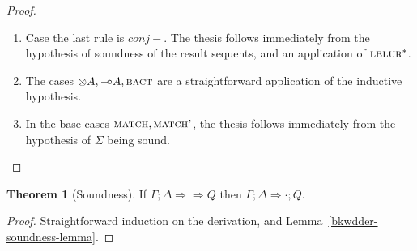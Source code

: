\documentclass{article}
\theoremstyle{definition}
\newtheorem{theorem}{Theorem}
\def\limp {\mathbin{{-}\mkern-3.5mu{\circ}}}
\newcommand{\bkwseq}[3]{#1 ; #2 \Longrightarrow #3}
\newcommand{\bneuseqsymb}{
  \mathrel{\Longrightarrow\!\!\!\!\!\!\!\!\Longrightarrow}}
\newcommand{\bneuseq}[3]{#1 ; #2 \bneuseqsymb #3}
\newcommand{\bact}{\textsc{bact}}
\newcommand{\matchrule}{\textsc{match}}
\newcommand{\matchprimerule}{\textsc{match'}}
\newcommand{\lblurstar}{\textsc{lblur}^*}
\begin{document}
\begin{proof}
\begin{enumerate}
  \item Case the last rule is $conj-$. The thesis follows immediately from
    the hypothesis of soundness of the result sequents, and an application of
    $\lblurstar$.
    
  \item The cases $\otimes A, \limp A, \bact$ are a straightforward application
    of the inductive hypothesis.
    
  \item In the base cases $\matchrule, \matchprimerule$, the thesis follows
    immediately from the hypothesis of $\Sigma$ being sound.

  \end{enumerate}
\end{proof}

\begin{theorem}[Soundness]
  If $\bneuseq{\Gamma}{\Delta}{Q}$ then $\bkwseq{\Gamma}{\Delta}{\cdot ; Q}$.  
\end{theorem}
\begin{proof}
  Straightforward induction on the derivation, and
  Lemma~\ref{bkwdder-soundness-lemma}.
\end{proof}
\end{document}
